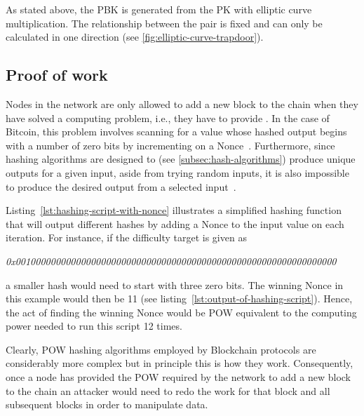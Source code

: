 As stated above, the \gls{PBK} is generated from the \gls{PK} with elliptic curve multiplication.
The relationship between the pair is fixed and can only be calculated in one direction (see \cref{fig:elliptic-curve-trapdoor}).

\subsection{Proof of work}\label{subsec:pow}

Nodes in the network are only allowed to add a new block to the chain when they have solved a computing problem, i.e., they have to provide .
In the case of Bitcoin, this problem involves scanning for a value whose hashed output begins with a number of zero bits by incrementing on a \gls{Nonce}~\autocite[3]{nakamoto_bitcoin_2008}.
Furthermore, since hashing algorithms are designed to (see \cref{subsec:hash-algorithms}) produce unique outputs for a given input, aside from trying random inputs, it is also impossible to produce the desired output from a selected input~\autocite[189]{antonopoulos_mastering_2017}.


Listing~\ref{lst:hashing-script-with-nonce} illustrates a simplified hashing function that will output different hashes by adding a \gls{Nonce} to the input value on each iteration.
For instance, if the difficulty target is given as

\smallskip
\begingroup\small\emph{0x0010000000000000000000000000000000000000000000000000000000000000}\endgroup
\smallskip

a smaller hash would need to start with three zero bits.
The winning \gls{Nonce} in this example would then be 11 (see listing~\ref{lst:output-of-hashing-script}).
Hence, the act of finding the winning \gls{Nonce} would be \gls{POW} equivalent to the computing power needed to run this script 12 times.


Clearly, \gls{POW} hashing algorithms employed by \gls{Blockchain} protocols are considerably more complex but in principle this is how they work.
Consequently, once a node has provided the \gls{POW} required by the network to add a new block to the chain an attacker would need to redo the work for that block and all subsequent blocks in order to manipulate data.

